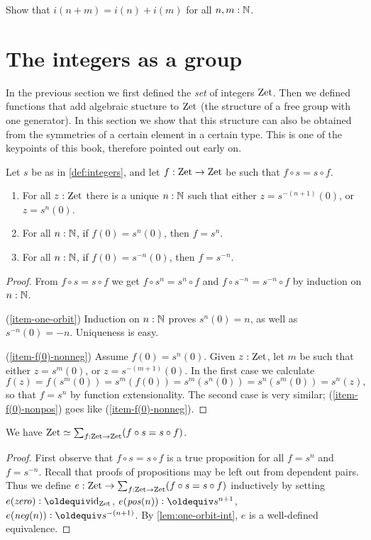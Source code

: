 \documentclass[a4,12pt]{amsart}
\begin{document}
\begin{xca}\label{xca:addition-on-Z-and-N}
Show that $i(n+m)=i(n)+i(m)$ for all $n,m:\mathbb{N}$.
\end{xca}


\section{The integers as a group}
\label{sec:integers-group}

In the previous section we first defined the \emph{set}
of integers $\mathrm{Zet}$. Then we defined functions that add
algebraic stucture to $\mathrm{Zet}$ (the structure of a free group 
with one generator). In this section we
show that this structure can also be obtained from the
symmetries of a certain element in a certain type.
This is one of the keypoints of this book, 
therefore pointed out early on.

\begin{lemma}\label{lem:one-orbit-int}
Let $s$ be as in \cref{def:integers}, and 
let $f:\mathrm{Zet}\to\mathrm{Zet}$ be such that $f\circ s = s\circ f$. 
  \begin{enumerate}
  \item\label{item-one-orbit} For all $z:\mathrm{Zet}$ there is a unique $n:\mathbb{N}$
such that either $z=s^{-(n+1)}(0)$, or $z=s^{n}(0)$.
  \item\label{item-f(0)-nonneg} For all $n:\mathbb{N}$, if $f(0)=s^{n}(0)$, then $f=s^{n}$.
  \item\label{item-f(0)-nonpos} For all $n:\mathbb{N}$, if $f(0)=s^{-n}(0)$, then $f=s^{-n}$.
  \end{enumerate}
\end{lemma}
\begin{proof}
From $f\circ s = s\circ f$ we get $f\circ s^n = s^n\circ f$
and $f\circ s^{-n} = s^{-n}\circ f$ by induction on $n:\mathbb{N}$.

(\ref{item-one-orbit}) Induction on $n:\mathbb{N}$ proves $s^{n}(0)=n$, 
as well as $s^{-n}(0)=-n$. Uniqueness is easy.

(\ref{item-f(0)-nonneg}) Assume $f(0)=s^{n}(0)$.  
Given $z:\mathrm{Zet}$, let $m$ be such that either $z=s^{m}(0)$, 
or $z=s^{-(m+1)}(0)$. In the first case we calculate
\[
f(z)=f(s^{m}(0))=s^{m}(f(0))=s^{m}(s^{n}(0))=s^{n}(s^{m}(0))= s^{n}(z),
\]
so that $f=s^{n}$ by function extensionality. 
The second case is very similar;
(\ref{item-f(0)-nonpos}) goes like (\ref{item-f(0)-nonneg}).
\end{proof}

\begin{corollary}\label{cor:pre-torsor-int}
We have $\mathrm{Zet}\simeq \sum_{f:\mathrm{Zet}\to\mathrm{Zet}} (f\circ s = s\circ f)$.
\end{corollary}
\begin{proof}
First observe that $f\circ s = s\circ f$ is a true proposition
for all $f=s^n$ and $f=s^{-n}$. Recall that proofs of propositions
may be left out from dependent pairs. Thus we
define $e : \mathrm{Zet}\to \sum_{f:\mathrm{Zet}\to\mathrm{Zet}} (f\circ s = s\circ f)$ 
inductively by setting 
$e(\zzero)\defeq \id_\zet$, 
$e(\zpos(n))\defeq s^{n+1}$,
$e(\zneg(n))\defeq s^{-(n+1)}$.
By \cref{lem:one-orbit-int}, $e$ is a well-defined equivalence.
\end{proof}
\end{document}
